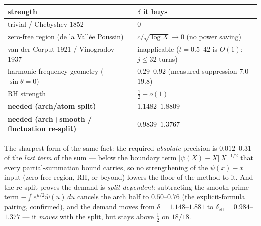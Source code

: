 \documentclass[11pt,a4paper]{article}
\begin{document}
\begin{center}\small
\begin{tabular}{@{}l l@{}}
\toprule
\textbf{strength} & \textbf{$\delta$ it buys}\\
\midrule
trivial / Chebyshev 1852 & $0$\\
zero-free region (de la Vall\'ee Poussin) & $c/\sqrt{\log X}\to0$ (no power saving)\\
van der Corput 1921 / Vinogradov 1937 & inapplicable ($t=0.5$--$42$ is $O(1)$; $j\le32$ turns)\\
harmonic-frequency geometry ($\sin\theta=0$) & $0.29$--$0.92$ (measured suppression $7.0$--$19.8$)\\
RH strength & $\tfrac12-o(1)$\\
\midrule
\textbf{needed (arch/atom split)} & $\boldsymbol{1.1482}$--$\boldsymbol{1.8809}$\\
\textbf{needed (arch+smooth / fluctuation re-split)} & $\boldsymbol{0.9839}$--$\boldsymbol{1.3767}$\\
\bottomrule
\end{tabular}
\end{center}

\noindent The sharpest form of the same fact: the required \emph{absolute}
precision is $0.012$--$0.31$ of the \emph{last term} of the sum --- below the
boundary term $|\psi(X)-X|\,X^{-1/2}$ that every partial-summation bound carries,
so no strengthening of the $\psi(x)-x$ input (zero-free region, RH, or beyond)
lowers the floor of the method to it. And the re-split proves the demand is
\emph{split-dependent}: subtracting the smooth prime term
$-\int e^{u/2}\widehat w(u)\,du$ cancels the arch half to $0.50$--$0.76$ (the
explicit-formula pairing, confirmed), and the demand moves from
$\delta=1.148$--$1.881$ to $\delta_{\mathrm{eff}}=0.984$--$1.377$ --- it
\emph{moves} with the split, but stays above $\tfrac12$ on $18/18$.
\end{document}
